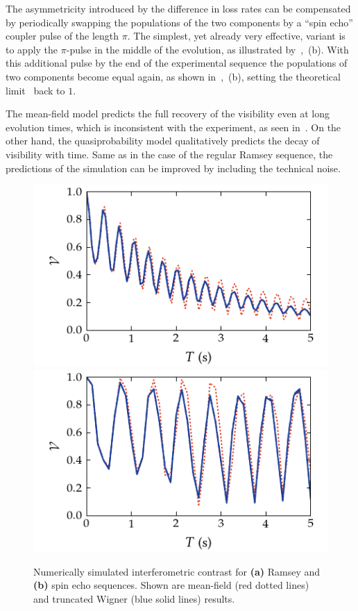 The asymmetricity introduced by the difference in loss rates can be compensated by periodically swapping the populations of the two components by a ``spin echo'' coupler pulse of the length $\pi$.
The simplest, yet already very effective, variant is to apply the $\pi$-pulse in the middle of the evolution, as illustrated by~,~(b).
With this additional pulse by the end of the experimental sequence the populations of two components become equal again, as shown in~,~(b), setting the theoretical limit~ back to $1$.

The mean-field model predicts the full recovery of the visibility even at long evolution times, which is inconsistent with the experiment, as seen in~.
On the other hand, the quasiprobability model qualitatively predicts the decay of visibility with time.
Same as in the case of the regular Ramsey sequence, the predictions of the simulation can be improved by including the technical noise.

\begin{figure}
    \centerline{%
    \includegraphics{figures_generated/bec_noise/ramsey_visibility_long.pdf}%
    \includegraphics{figures_generated/bec_noise/echo_visibility_long.pdf}}

    \caption{Numerically simulated interferometric contrast for \textbf{(a)} Ramsey and \textbf{(b)} spin echo sequences.
    Shown are mean-field (red dotted lines) and truncated Wigner (blue solid lines) results.}

    \label{fig:bec-noise:visibility:visibility-long}
\end{figure}

